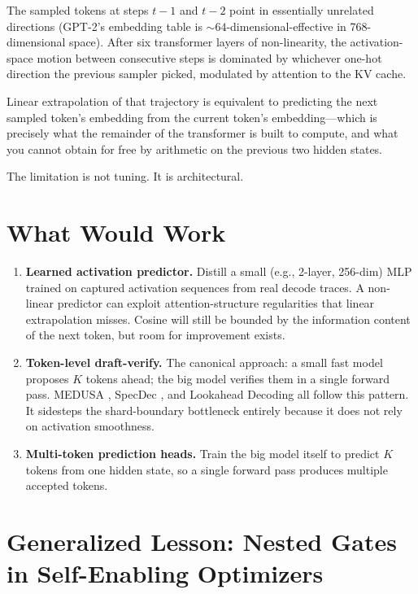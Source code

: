 \documentclass[11pt,letterpaper]{article}
\begin{document}
The sampled tokens at steps $t-1$ and $t-2$ point in essentially unrelated directions (GPT-2's embedding table is $\sim 64$-dimensional-effective in 768-dimensional space). After six transformer layers of non-linearity, the activation-space motion between consecutive steps is dominated by whichever one-hot direction the previous sampler picked, modulated by attention to the KV cache.

Linear extrapolation of that trajectory is equivalent to predicting the next sampled token's embedding from the current token's embedding—which is precisely what the remainder of the transformer is built to compute, and what you cannot obtain for free by arithmetic on the previous two hidden states.

The limitation is not tuning. It is architectural.

\section{What Would Work}

\begin{enumerate}
\item \textbf{Learned activation predictor.} Distill a small (e.g., 2-layer, 256-dim) MLP trained on captured activation sequences from real decode traces. A non-linear predictor can exploit attention-structure regularities that linear extrapolation misses. Cosine will still be bounded by the information content of the next token, but room for improvement exists.

\item \textbf{Token-level draft-verify.} The canonical approach: a small fast model proposes $K$ tokens ahead; the big model verifies them in a single forward pass. MEDUSA \cite{medusa}, SpecDec \cite{specdec}, and Lookahead Decoding \cite{lookahead} all follow this pattern. It sidesteps the shard-boundary bottleneck entirely because it does not rely on activation smoothness.

\item \textbf{Multi-token prediction heads.} Train the big model itself to predict $K$ tokens from one hidden state, so a single forward pass produces multiple accepted tokens.
\end{enumerate}

\section{Generalized Lesson: Nested Gates in Self-Enabling Optimizers}
\end{document}
